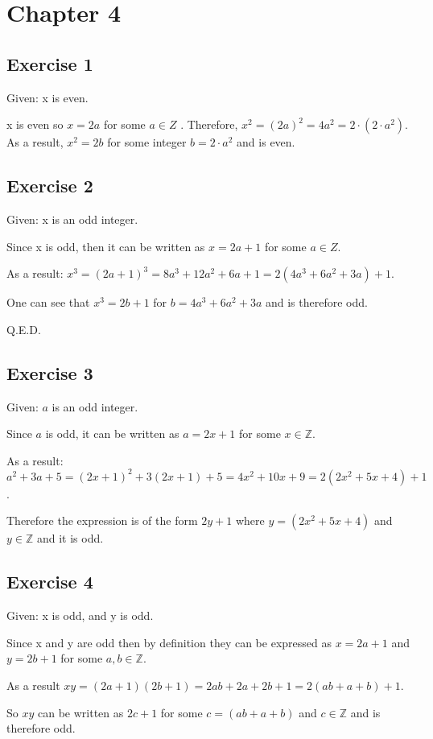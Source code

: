 \documentclass[a4paper]{article}
\begin{document}
\section{Chapter 4}

\subsection{Exercise 1}

Given: x is even.

x is even so $x = 2a$ for some $ a \in Z $ . Therefore,
$ x^2 = (2a)^2 = 4a^2 = 2\cdot(2\cdot a^2)$. As a result, $x^2 = 2b$
for some integer $b = 2 \cdot a^2 $ and is even.

\subsection{Exercise 2}

Given: x is an odd integer.

Since x is odd, then it can be written as $x = 2a+1$ for some $a \in Z$.

As a result:
$x^3 = (2a+1)^3 = 8a^3 + 12a^2 + 6a + 1 = 2\left(4a^3+6a^2+3a\right) + 1 $.

One can see that $x^3 = 2b+1$ for $b = 4a^3+6a^2+3a$ and is therefore odd.

Q.E.D.

\subsection{Exercise 3}

Given: $a$ is an odd integer.

Since $a$ is odd, it can be written as $a = 2x+1$ for some $x \in \mathbb{Z}$.

As a result: $a^2 + 3a + 5 = (2x+1)^2 + 3(2x+1) + 5 = 4x^2+10x+9 =
2\left(2x^2+5x+4\right) + 1$ .

Therefore the expression is of the form $2y+1$ where
$y = \left(2x^2+5x+4\right)$ and $y \in \mathbb{Z}$ and it is odd.

\subsection{Exercise 4}

Given: x is odd, and y is odd.

Since x and y are odd then by definition they can be expressed as $ x = 2a+1 $
and $ y = 2b+1$ for some $ a, b \in \mathbb{Z} $.

As a result $xy = (2a+1)(2b+1) = 2ab + 2a + 2b + 1 = 2(ab+a+b)+1$.

So $xy$ can be written as $2c+1$ for some $c=(ab+a+b)$ and $c \in \mathbb{Z}$
and is therefore odd.
\end{document}
